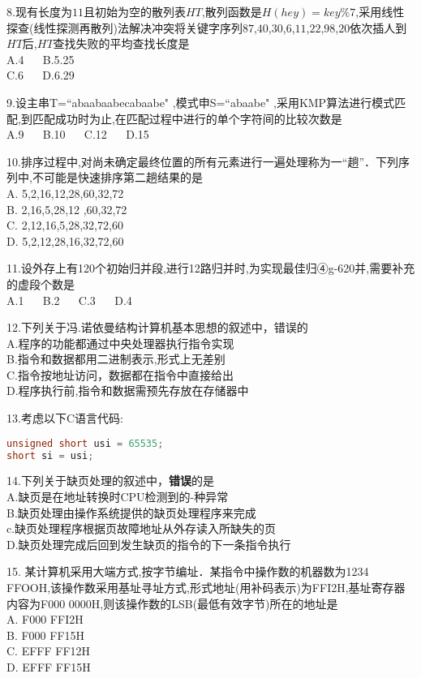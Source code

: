 8.现有长度为$11$且初始为空的散列表$HT$,散列函数是$H(hey)= key\%7$,采用线性探查(线性探测再散列)法解决冲突将关键字序列$87$,$40$,$30$,$6$,$11$,$22$,$98$,$20$依次插人到$HT$后,$HT$查找失败的平均查找长度是 \\
A.4 $\quad$ B.5.25 \\
C.6 $\quad$ D.6.29

9.设主串T=“abaabaabecabaabe" ,模式申S=“abaabe" ,采用KMP算法进行模式匹配,到匹配成功时为止,在匹配过程中进行的单个字符间的比较次数是 \\
A.9 $\quad$ B.10 $\quad$ C.12 $\quad$ D.15

10.排序过程中,对尚未确定最终位置的所有元素进行一遍处理称为一“趟”．下列序列中,不可能是快速排序第二趟结果的是 \\
A. 5,2,16,12,28,60,32,72 \\
B. 2,16,5,28,12 ,60,32,72 \\
C. 2,12,16,5,28,32,72,60 \\
D. 5,2,12,28,16,32,72,60

11.设外存上有120个初始归并段,进行12路归并时,为实现最佳归④g-620并,需要补充的虚段个数是 \\
A.1 $\quad$ B.2 $\quad$ C.3 $\quad$ D.4

12.下列关于冯.诺依曼结构计算机基本思想的叙述中，错误的 \\
A.程序的功能都通过中央处理器执行指令实现 \\
B.指令和数据都用二进制表示,形式上无差别 \\
C.指令按地址访问，数据都在指令中直接给出 \\
D.程序执行前,指令和数据需预先存放在存储器中

13.考虑以下C语言代码:
\begin{lstlisting}[language=cpp]
unsigned short usi = 65535;
short si = usi;
\end{lstlisting}

14.下列关于缺页处理的叙述中，\textbf{错误}的是 \\
A.缺页是在地址转换时CPU检测到的-种异常 \\
B.缺页处理由操作系统提供的缺页处理程序来完成 \\
c.缺页处理程序根据页故障地址从外存读入所缺失的页 \\
D.缺页处理完成后回到发生缺页的指令的下一条指令执行

15. 某计算机采用大端方式,按字节编址．某指令中操作数的机器数为1234 FFOOH,该操作数采用基址寻址方式,形式地址(用补码表示)为FFI2H,基址寄存器内容为F000 0000H,则该操作数的LSB(最低有效字节)所在的地址是 \\
A. F000 FFI2H \\
B. F000 FF15H \\
C. EFFF FF12H \\
D. EFFF FF15H

